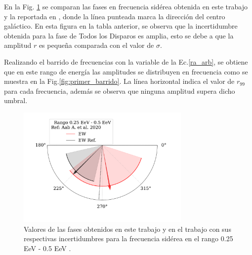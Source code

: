 En la Fig. \ref{fig:primer} se comparan las  fases en frecuencia sidérea obtenida en este trabajo y la reportada en \cite{Aab_2020}, donde la línea punteada marca la dirección del centro galáctico.  En esta figura en la tabla anterior, se observa que la incertidumbre obtenida para la fase de Todos los Disparos es amplia, esto se debe a que la amplitud $r$ es pequeña comparada con el valor de $\sigma$. 


Realizando el barrido de frecuencias con la variable de la Ec.\ref{ra_arb}, se obtiene que en este rango de energía las amplitudes se  distribuyen en frecuencia como se muestra en la Fig.\ref{fig:primer_barrido}. La línea horizontal indica el valor de $r_{99}$ para cada frecuencia, además se observa que ninguna amplitud supera dicho umbral.

\begin{figure}[H]
    \begin{small}
        \begin{center}
            \includegraphics[width=0.75\textwidth]{phase_primer_bin_v2.pdf}
        \end{center}
        \caption{Valores de las fases obtenidos en este trabajo y en el trabajo \cite{Aab_2020} con sus respectivas incertidumbres para la frecuencia sidérea en el  rango 0.25 EeV - 0.5 EeV .}
        \label{fig:primer}
    \end{small}
\end{figure}


